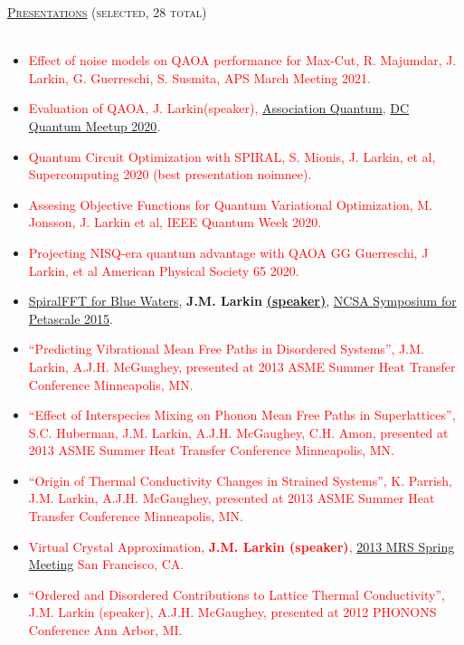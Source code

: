 \documentclass{article}
\newcommand{\lineunder}{\vspace*{-8pt} \\ \hspace*{-18pt} \hrulefill \\}
\newcommand{\header}[1]{{\hspace*{-15pt}\vspace*{6pt} \textsc{#1}} \vspace*{-6pt} \lineunder}
\newenvironment{achievements}{\begin{list}{$\bullet$}{\topsep 0pt \itemsep -2pt}}{\vspace*{4pt}\end{list}}
\begin{document}
\header{\Large{\href{http://jasonlarkin.org/pres.html}{Presentations} (selected, 28 total)}}
\begin{itemize}[leftmargin=*]
\item \textcolor{red}{Effect of noise models on QAOA performance for Max-Cut, R. Majumdar, J. Larkin, G. Guerreschi, S. Susmita, APS March Meeting 2021.}
\item \textcolor{red}{Evaluation of QAOA, J. Larkin(speaker), \href{https://www.youtube.com/watch?v=I7yp-qXk0Zo}{Association Quantum}, \href{https://www.meetup.com/Washington-Quantum-Computing-Meetup/events/272829277/}{DC Quantum Meetup 2020}.} 
\item \textcolor{red}{Quantum Circuit Optimization with SPIRAL, S. Mionis, J. Larkin, et al, Supercomputing 2020 (best presentation noimnee).}
\item \textcolor{red}{Assesing Objective Functions for Quantum Variational Optimization, M. Jonsson, J. Larkin et al, IEEE Quantum Week 2020.}
\item \textcolor{red}{Projecting NISQ-era quantum advantage with QAOA
GG Guerreschi, J Larkin, et al American Physical Society 65 2020.}
\item \href{https://bluewaters.ncsa.illinois.edu/documents/10157/5a0a0d37-95bf-460b-a7f0-cfadd15abec8}{SpiralFFT for Blue Waters}, \textbf{J.M. Larkin} \href{https://www.youtube.com/watch?v=rjbEWeu2Nwc&feature=youtu.be#t=51m53s}{\textbf{(speaker)}}, \href{https://bluewaters.ncsa.illinois.edu/paid-ime#SPIRAL FFT}{NCSA Symposium for Petascale 2015}.
\item \textcolor{red}{“Predicting Vibrational Mean Free Paths in Disordered Systems”, J.M. Larkin, A.J.H. McGuaghey,  presented at 2013 ASME Summer Heat Transfer Conference Minneapolis, MN.}
\item \textcolor{red}{“Effect of Interspecies Mixing on Phonon Mean Free Paths in Superlattices”, S.C. Huberman, J.M. Larkin, A.J.H. McGaughey, C.H. Amon, presented at 2013 ASME Summer Heat Transfer Conference Minneapolis, MN.}
\item \textcolor{red}{“Origin of Thermal Conductivity Changes in Strained Systems”, K. Parrish, J.M. Larkin, A.J.H. McGaughey, presented at 2013 ASME Summer Heat Transfer Conference Minneapolis, MN.}
\item \textcolor{red}{Virtual Crystal Approximation, \textbf{J.M. Larkin (speaker)}, \href{http://www.mrs.org/spring2013/}{2013 MRS Spring Meeting} San Francisco, CA.}
\item \textcolor{red}{“Ordered and Disordered Contributions to Lattice Thermal Conductivity”, J.M. Larkin (speaker), A.J.H. McGaughey, presented at 2012 PHONONS Conference Ann Arbor, MI.}

\end{itemize}
\end{document}
